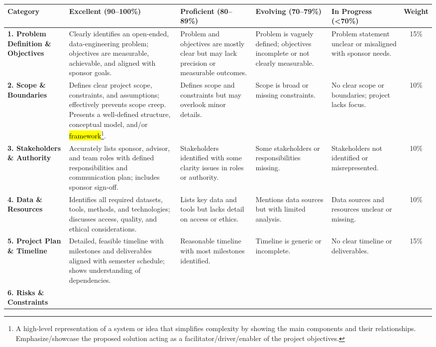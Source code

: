 \documentclass[landscape, 11pt]{article}
\begin{document}
\begin{longtable}{L{2.8cm}L{7cm}L{4cm}L{4cm}L{4cm}|c}
\toprule
\textbf{Category} & \textbf{Excellent (90--100\%)} & \textbf{Proficient (80--89\%)} & \textbf{Evolving (70--79\%)} & \textbf{In Progress (<70\%)} & \textbf{Weight} \\
\midrule
\textbf{1. Problem Definition \& Objectives} & 
Clearly identifies an open-ended, data-engineering problem; objectives are measurable, achievable, and aligned with sponsor goals. &
Problem and objectives are mostly clear but may lack precision or measurable outcomes. &
Problem is vaguely defined; objectives incomplete or not clearly measurable. &
Problem statement unclear or misaligned with sponsor needs. & 15\% \\
\midrule
\textbf{2. Scope \& Boundaries} &
Defines clear project scope, constraints, and assumptions; effectively prevents scope creep. Presents a well-defined structure, conceptual model, and/or \hl{framework}\footnote{A high-level representation of a system or idea that simplifies complexity by showing the main components and their relationships. Emphasize/showcase the proposed solution acting as a facilitator/driver/enabler of the project objectives.}.&
Defines scope and constraints but may overlook minor details. &
Scope is broad or missing constraints. &
No clear scope or boundaries; project lacks focus. & 10\% \\
\midrule
\textbf{3. Stakeholders \& Authority} &
Accurately lists sponsor, advisor, and team roles with defined responsibilities and communication plan; includes sponsor sign-off. &
Stakeholders identified with some clarity issues in roles or authority. &
Some stakeholders or responsibilities missing. &
Stakeholders not identified or misrepresented. & 10\% \\
\midrule
\textbf{4. Data \& Resources} &
Identifies all required datasets, tools, methods, and technologies; discusses access, quality, and ethical considerations. &
Lists key data and tools but lacks detail on access or ethics. &
Mentions data sources but with limited analysis. &
Data sources and resources unclear or missing. & 10\% \\
\midrule
\textbf{5. Project Plan \& Timeline} &
Detailed, feasible timeline with milestones and deliverables aligned with semester schedule; shows understanding of dependencies. &
Reasonable timeline with most milestones identified. &
Timeline is generic or incomplete. &
No clear timeline or deliverables. & 15\% \\
\midrule
\textbf{6. Risks \& Constraints} &

\end{longtable}
\end{document}
